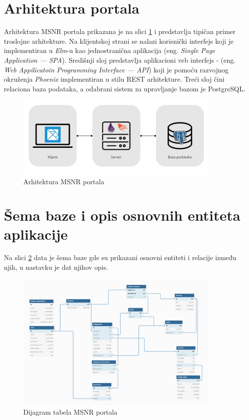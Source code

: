 \documentclass[12pt,oneside]{memoir}
\begin{document}
\section{Arhitektura portala}
Arhitektura MSNR portala prikazana je na slici \ref{fig:msnr-arch} i predstavlja tipičan primer troslojne arhitekture.
Na klijentskoj strani se nalazi korisnički interfejs koji je implementiran u \emph{Elm}-u kao jednostranična aplikacija (eng. \emph{Single Page Application --- SPA}).
Središnji sloj predstavlja aplikacioni veb interfejs - (eng. \emph{Web Appilicatoin Programming Interface --- API})
koji je pomoću razvojnog okruženja \emph{Phoenix} implementiran u stilu REST arhitekture.
Treći sloj čini relaciona baza podataka, a odabrani sistem za upravljanje bazom je PostgreSQL.
\begin{figure}[!ht]
  \centering
  \includegraphics[width=0.9\textwidth]{msnr-arch.png}
  \caption{Arhitektura MSNR portala}
  \label{fig:msnr-arch}
\end{figure}

\section{Šema baze i opis osnovnih entiteta aplikacije}
Na slici \ref{fig:msnr-db} data je šema baze gde su prikazani osnovni entiteti i relacije između njih, u nastavku je dat njihov opis.
\begin{figure}[!ht]
  \centering
  \includegraphics[width=0.9\textwidth]{msnr-db.png}
  \caption{Dijagram tabela MSNR portala}
  \label{fig:msnr-db}
\end{figure}
\end{document}
